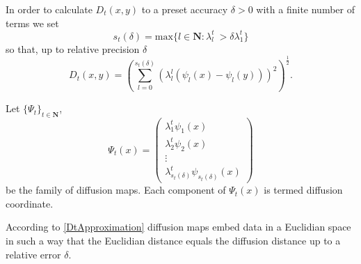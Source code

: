 In order to calculate $D_t(x,y)$ to a preset accuracy $\delta>0$ with a finite number of terms we set
$$s_t(\delta)= \text{max}\{l\in\mathbf{N} : \lambda_l^t \>> \delta\lambda_1^t\}$$
so that, up to relative precision $\delta$
\begin{equation}\label{DtApproximation}
D_t(x,y)=\left(\sum_{l=0}^{s_t(\delta)} \left(\lambda_l^{l}(\psi_l(x) - \psi_l(y))\right)^2 \right)^{\frac{1}{2}}.
\end{equation}

\begin{definition}
Let $\{\Psi_t\}_{t\in\mathbf{N}}$,
$$\Psi_t(x)=\begin{pmatrix}
  \lambda_1^{t}\psi_1(x) \\
  \lambda_2^{t}\psi_2(x) \\
  \vdots \\
  \lambda_{s_t(\delta)}^{t}\psi_{s_t(\delta)}(x)
 \end{pmatrix}$$ be the family of diffusion maps. Each component of $\Psi_t(x)$ is termed diffusion coordinate.
\end{definition}

According to \eqref{DtApproximation} diffusion maps embed data in a Euclidian space in such a way that the Euclidian distance equals the diffusion distance up to a relative error $\delta$.

